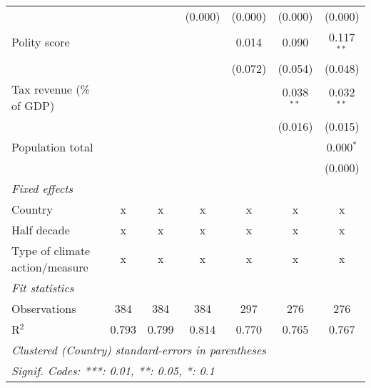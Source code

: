 \begin{tabular}{lcccccc}
                                                                               &              &               & (0.000)        & (0.000)        & (0.000)        & (0.000)\\   
   Polity score                                                                &              &               &                & 0.014          & 0.090          & 0.117$^{**}$\\   
                                                                               &              &               &                & (0.072)        & (0.054)        & (0.048)\\   
   Tax revenue (\% of GDP)                                                     &              &               &                &                & 0.038$^{**}$   & 0.032$^{**}$\\   
                                                                               &              &               &                &                & (0.016)        & (0.015)\\   
   Population total                                                            &              &               &                &                &                & 0.000$^{*}$\\   
                                                                               &              &               &                &                &                & (0.000)\\   
   \emph{Fixed effects}\\
   Country                                                                     & x            & x             & x              & x              & x              & x\\  
   Half decade                                                                 & x            & x             & x              & x              & x              & x\\  
   Type of climate action/measure                                              & x            & x             & x              & x              & x              & x\\  
   \midrule \emph{Fit statistics}\\
   Observations                                                                & 384          & 384           & 384            & 297            & 276            & 276\\  
   R$^2$                                                                       & 0.793        & 0.799         & 0.814          & 0.770          & 0.765          & 0.767\\  
   \midrule
   \multicolumn{7}{l}{\emph{Clustered (Country) standard-errors in parentheses}}\\
   \multicolumn{7}{l}{\emph{Signif. Codes: ***: 0.01, **: 0.05, *: 0.1}}\\
\end{tabular}
\par\endgroup


